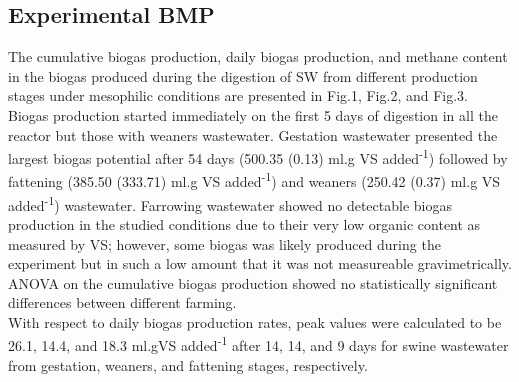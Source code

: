 \subsection{Experimental BMP}
The cumulative biogas production, daily biogas production, and methane content in the biogas produced during the digestion of SW from different production stages under mesophilic conditions are presented in Fig.1, Fig.2, and Fig.3.\\
Biogas production started immediately on the first 5 days of digestion in all the reactor but those with weaners wastewater.
Gestation wastewater presented the largest biogas potential after 54 days (500.35 (0.13) ml.g VS added\textsuperscript{-1}) followed by fattening (385.50 (333.71) ml.g VS added\textsuperscript{-1}) and weaners (250.42 (0.37) ml.g VS added\textsuperscript{-1}) wastewater. Farrowing wastewater showed no detectable biogas production in the studied conditions due to their very low organic content as measured by VS; however, some biogas was likely produced during the experiment but in such a low amount that it was not measureable gravimetrically.  ANOVA on the cumulative biogas production showed no statistically significant differences between different farming.\\
With respect to daily biogas production rates, peak values were calculated to be 26.1, 14.4, and 18.3 ml.gVS added\textsuperscript{-1} after 14, 14, and 9 days for swine wastewater from gestation, weaners, and fattening stages, respectively.